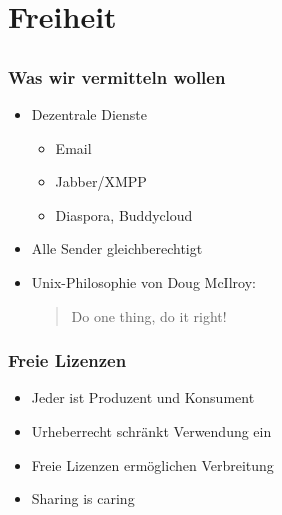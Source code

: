 \documentclass{beamer}
\newcommand{\ben}[1]{\pdfcomment[author=Ben]{#1}}
\begin{document}
\section{Freiheit}
\subsection{}

\begin{frame}
    \frametitle{Was wir vermitteln wollen}
    \begin{itemize}
        \item<2-> Dezentrale Dienste
            \begin{itemize}
                \item<3-> Email
                \item<4-> Jabber/XMPP
                \item<5-> Diaspora, Buddycloud
            \end{itemize}
        \item<6-> Alle Sender gleichberechtigt
        \item<7-> Unix-Philosophie von Doug McIlroy:
            \begin{quote}Do one thing, do it right!
            \end{quote}
    \end{itemize}
\end{frame}

\begin{frame}
    \frametitle{Freie Lizenzen}
    \begin{itemize}
        \item<2-> Jeder ist Produzent und Konsument
        \item<3-> Urheberrecht schränkt Verwendung ein
        \item<4-> Freie Lizenzen ermöglichen Verbreitung
        \item<5-> Sharing is caring
    \end{itemize}
\end{frame}
\end{document}
